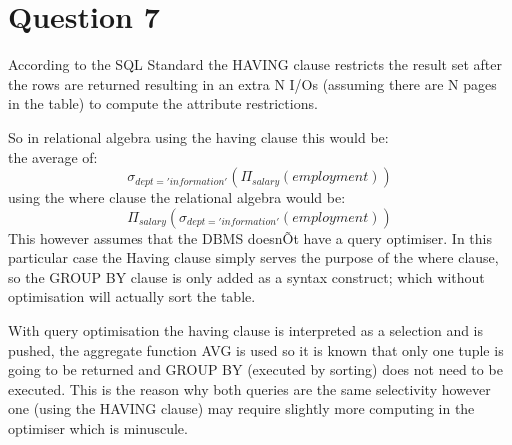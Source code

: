 \section*{Question 7}
According to the SQL Standard the HAVING clause restricts the result set after the rows are returned resulting in an extra N I/Os (assuming there are N pages in the table) to compute the attribute restrictions. 

So in relational algebra using the having clause this would be:
\\the average of:
$$\sigma_{dept='information'}(\Pi_{salary}(employment))$$
using the where clause the relational algebra would be:
$$\Pi_{salary}(\sigma_{dept='information'}(employment))$$
This however assumes that the DBMS doesnÕt have a query optimiser. In this particular case the Having clause simply serves the purpose of the where clause, so the GROUP BY clause is only added as a syntax construct; which without optimisation will actually sort the table. 

With query optimisation the having clause is interpreted as a selection and is pushed, the aggregate function AVG is used so it is known that only one tuple is going to be returned and GROUP BY (executed by sorting) does not need to be executed.
This is the reason why both queries are the same selectivity however one (using the HAVING clause) may require slightly more computing in the optimiser which is minuscule.


